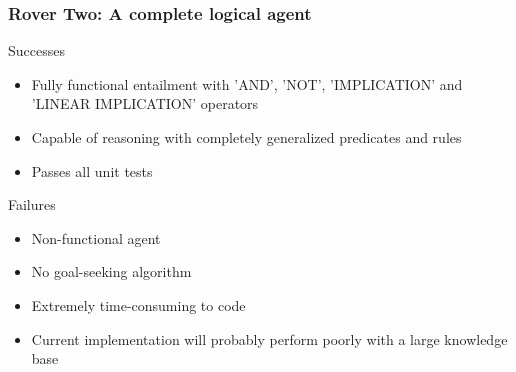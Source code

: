 \begin{frame}
    \frametitle{Rover Two: A complete logical agent}

    \begin{block}{Successes}
        \begin{itemize}
            \item Fully functional entailment with 'AND', 'NOT',
                'IMPLICATION' and 'LINEAR IMPLICATION' operators
            \item Capable of reasoning with completely generalized
                predicates and rules
            \item Passes all unit tests
        \end{itemize}
    \end{block}

    \begin{block}{Failures}
        \begin{itemize}
            \item Non-functional agent
            \item No goal-seeking algorithm
            \item Extremely time-consuming to code
            \item Current implementation will probably perform poorly
                with a large knowledge base
        \end{itemize}
    \end{block}

\end{frame}

